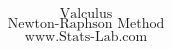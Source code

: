 \documentclass{beamer}
\begin{document}
\begin{frame}


{
\huge
\[ \mbox{Valculus} \]
\[ \mbox{Newton-Raphson Method} \]
}
{
\Large
\[ \mbox{www.Stats-Lab.com} \]
}
\end{frame}
\end{document}
